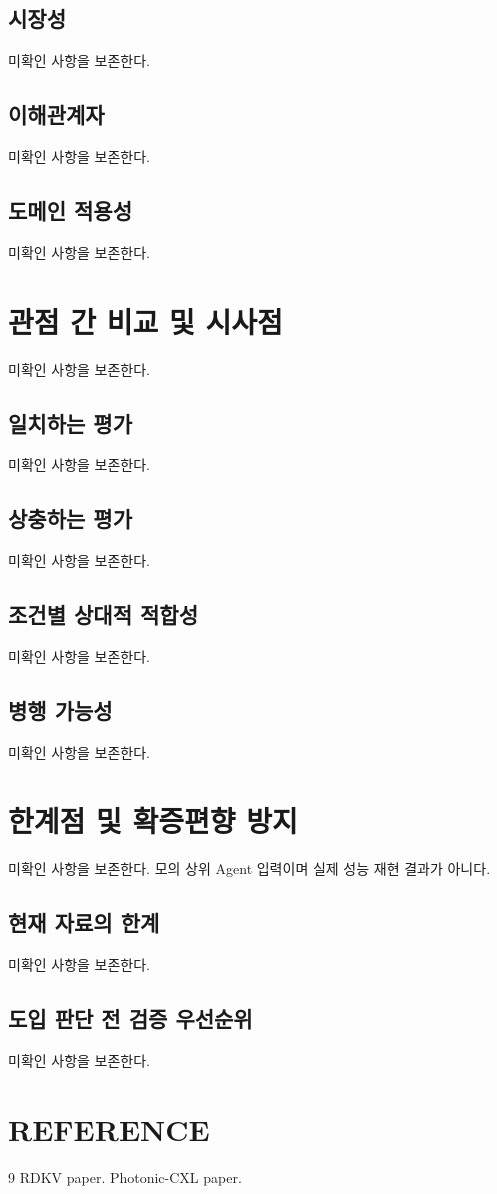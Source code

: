 \documentclass[11pt,a4paper]{article}
\begin{document}
\subsection{시장성}
미확인 사항을 보존한다.
\subsection{이해관계자}
미확인 사항을 보존한다.
\subsection{도메인 적용성}
미확인 사항을 보존한다.
\section{관점 간 비교 및 시사점}
미확인 사항을 보존한다.
\subsection{일치하는 평가}
미확인 사항을 보존한다.
\subsection{상충하는 평가}
미확인 사항을 보존한다.
\subsection{조건별 상대적 적합성}
미확인 사항을 보존한다.
\subsection{병행 가능성}
미확인 사항을 보존한다.
\section{한계점 및 확증편향 방지}
미확인 사항을 보존한다. 모의 상위 Agent 입력이며 실제 성능 재현 결과가 아니다.
\subsection{현재 자료의 한계}
미확인 사항을 보존한다.
\subsection{도입 판단 전 검증 우선순위}
미확인 사항을 보존한다.
\section{REFERENCE}

\renewcommand{\refname}{}
\begin{thebibliography}{9}
 RDKV paper.
 Photonic-CXL paper.
\end{thebibliography}
\end{document}
